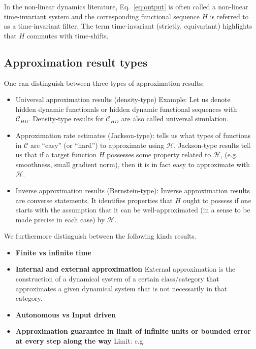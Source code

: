 \documentclass{article}
\theoremstyle{definition}
\theoremstyle{remark}
\begin{document}
In the non-linear dynamics literature, Eq.~\ref{eq:output} is often called a non-linear time-invariant system and the corresponding functional sequence $H$ is referred to as a time-invariant filter.
The term time-invariant (strictly, equivariant) highlights that $H$ commutes with time-shifts.



\subsection{Approximation result types}
One can distinguish between three types of approximation results\citep{jiang2023brief}:
\begin{itemize}
    \item Universal approximation results (density-type)
    \citep{li2021approximation}
    Example: Let us denote hidden dynamic functionals or hidden dynamic functional sequences with $\mathcal{C}_{HD}$. Density-type results for $\mathcal{C}_{HD}$ are also called universal simulation.
    \item Approximation rate estimates (Jackson-type): tells us  what types of functions in $\mathcal{C}$ are “easy” (or “hard”) to approximate using $\mathcal{H}$.
    Jackson-type results tell us that if a target function $H$ possesses some property related to $\mathcal{H}$, (e.g. smoothness, small gradient norm), then it is in fact easy to approximate with $\mathcal{H}$. 
    \citep{allen2019convergence}
    \item Inverse approximation results (Bernstein-type): Inverse approximation results are converse statements. It identifies properties that $H$ ought to possess if one starts with the assumption that it can be well-approximated (in a sense to be made precise in each case) by $\mathcal{H}$.
\end{itemize}

We furthermore distinguish between the following kinds results.
\begin{itemize}
\item \textbf{Finite vs infinite time}
\item \textbf{Internal and external approximation}
External approximation is the construction of a dynamical system of a certain class/category that approximates a given dynamical system that is not necessarily in that category.
\item  \textbf{Autonomous vs Input driven}
\item \textbf{Approximation guarantee in limit of infinite units or bounded error at every step along the way}
Limit: e.g. \citep{podlaski2024approximating}
\end{itemize}
\end{document}
